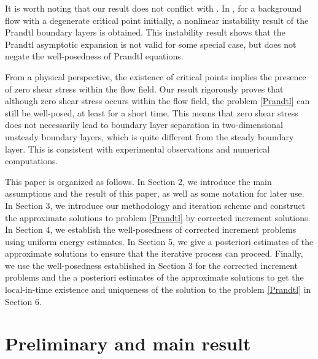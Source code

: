 \documentclass{amsart}
\numberwithin{equation}{section}
\begin{document}
It is worth noting that our result does not conflict with \cite{Grenier2}. In \cite{Grenier2}, for a background flow with a degenerate critical point initially, a nonlinear instability result of the Prandtl boundary layers is obtained. This instability result shows that the Prandtl asymptotic expansion is not valid for some special case, but does not negate the well-posedness of Prandtl equations.

From a physical perspective, the existence of critical points implies the presence of zero shear stress within the flow field. Our result rigorously proves that although zero shear stress occurs within the flow field, the problem \eqref{Prandtl} can still be well-posed, at least for a short time. This means that zero shear stress does not necessarily lead to boundary layer separation in two-dimensional unsteady boundary layers, which is quite different from the steady boundary layer. This is consistent with experimental observations and numerical computations.

This paper is organized as follows. In Section 2, we introduce the main assumptions and the result of this paper, as well as some notation for later use. In Section 3, we introduce our methodology and iteration scheme  and construct the approximate solutions to  problem \eqref{Prandtl} by corrected increment solutions. In Section 4, we establish the well-posedness of corrected increment problems using uniform energy estimates. In Section 5, we give  a posteriori estimates of the approximate solutions to ensure that the iterative process can proceed. Finally, we use the well-posedness established in Section 3 for the corrected increment problems and the a posteriori estimates of the approximate solutions to get the local-in-time existence and uniqueness of the solution to the problem \eqref{Prandtl} in Section 6.


\section{Preliminary and main result}
\end{document}

